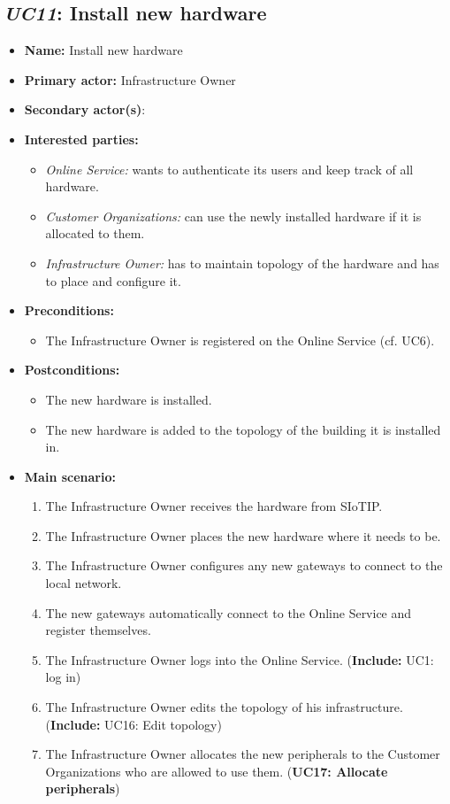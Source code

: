 \documentclass[english]{sareport}
\begin{document}
\subsection{\emph{UC11}: Install new hardware}
\begin{itemize}
    \item \textbf{Name:} Install new hardware
    \item \textbf{Primary actor:} Infrastructure Owner
    \item \textbf{Secondary actor(s)}: 
    \item \textbf{Interested parties:} 
        \begin{itemize}
            \item \textit{Online Service:}  wants to authenticate its users and keep track of all hardware.
            \item \textit{Customer Organizations:} can use the newly installed hardware if it is allocated to them.
            \item \textit{Infrastructure Owner:} has to maintain topology of the hardware and has to place and configure it.
        \end{itemize}

    \item \textbf{Preconditions:}
        \begin{itemize}
            \item The Infrastructure Owner is registered on the Online Service (cf. UC6).
        \end{itemize}

    \item \textbf{Postconditions:}
        \begin{itemize}
            \item The new hardware is installed.
            \item The new hardware is added to the topology of the building it is installed in.
        \end{itemize}
        
    \item \textbf{Main scenario:} 
    \begin{enumerate}
       \item The Infrastructure Owner receives the hardware from SIoTIP.
       \item The Infrastructure Owner places the new hardware where it needs to be.
       \item The Infrastructure Owner configures any new gateways to connect to the local network.
       \item The new gateways automatically connect to the Online Service and register themselves.
       \item The Infrastructure Owner logs into the Online Service. (\textbf{Include:} UC1: log in)
       \item The Infrastructure Owner edits the topology of his infrastructure. (\textbf{Include:} UC16: Edit topology)
       \item The Infrastructure Owner allocates the new peripherals to the Customer Organizations who are allowed to use them. (\textbf{UC17: Allocate peripherals})
    \end{enumerate}
\end{itemize}
\end{document}
